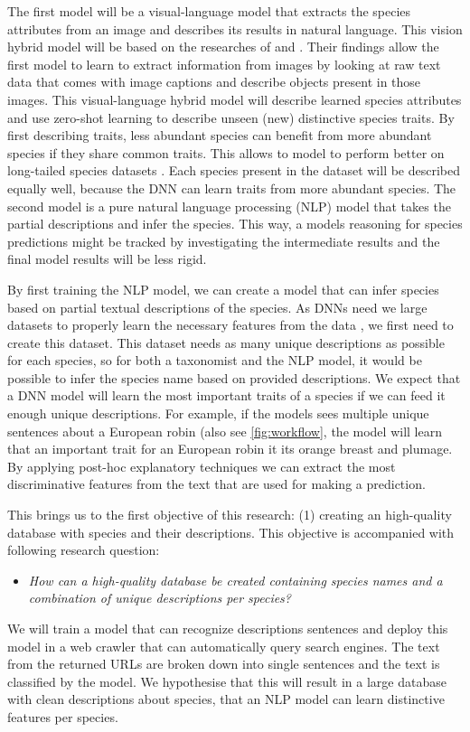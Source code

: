 \documentclass[a4paper, 12pt, oneside]{book} %
\begin{document}
The first model will be a visual-language model that extracts the species attributes from an image and describes its results in natural language. 
This vision hybrid model will be based on the researches of \textcite{radford_learning_2021} and \textcite{huang_interpretable_2020}.
Their findings allow the first model to learn to extract information from images by looking at raw text data that comes with image captions and describe objects present in those images.
This visual-language hybrid model will describe learned species attributes and use zero-shot learning to describe unseen (new) distinctive species traits.
By first describing traits, less abundant species can benefit from more abundant species if they share common traits.
This allows to model to perform better on long-tailed species datasets \autocite{van_horn_inaturalist_2018}.
Each species present in the dataset will be described equally well, because the DNN can learn traits from more abundant species.
The second model is a pure natural language processing (NLP) model that takes the partial descriptions and infer the species.
This way, a models reasoning for species predictions might be tracked by investigating the intermediate results \autocite{ishikawa_contextual_2021} and the final model results will be less rigid.

By first training the NLP model, we can create a model that can infer species based on partial textual descriptions of the species. 
As DNNs need we large datasets to properly learn the necessary features from the data \autocite{xue-wen_chen_big_2014, gheisari_survey_2017}, we first need to create this dataset.
This dataset needs as many unique descriptions as possible for each species, so for both a taxonomist and the NLP model, it would be possible to infer the species name based on provided descriptions.
We expect that a DNN model will learn the most important traits of a species if we can feed it enough unique descriptions.
For example, if the models sees multiple unique sentences about a European robin (also see \ref{fig:workflow}, the model will learn that an important trait for an European robin it its orange breast and plumage.
By applying post-hoc explanatory techniques we can extract the most discriminative features from the text that are used for making a prediction.


This brings us to the first objective of this research: (1) creating an high-quality database with species and their descriptions.
This objective is accompanied with following research question:
\begin{itemize}
    \item \emph{How can a high-quality database be created containing species names and a combination of unique descriptions per species?}
\end{itemize}
We will train a model that can recognize descriptions sentences and deploy this model in a web crawler that can automatically query search engines.
The text from the returned URLs are broken down into single sentences and the text is classified by the model.
We hypothesise that this will result in a large database with clean descriptions about species, that an NLP model can learn distinctive features per species.
\end{document}
